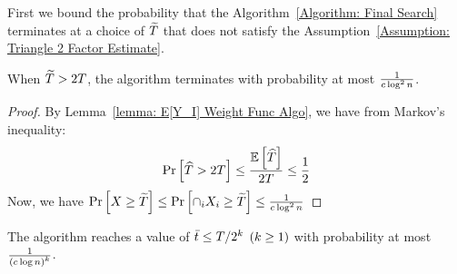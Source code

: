 First we bound the probability that the Algorithm~\ref{Algorithm: Final Search} terminates at a choice of $\widetilde{T}$ that does not satisfy the Assumption~\ref{Assumption: Triangle 2 Factor Estimate}.

\begin{lemma}\label{Lemma: Final Search Wrong Termination Bound}
    When $\widetilde{T} > 2T$, the algorithm terminates with probability at most $\frac{1}{c\log^2 n}$.
    
\end{lemma}

\begin{proof}
    By Lemma~\ref{lemma: E[Y_I] Weight Func Algo}, we have from Markov's inequality:
    \begin{align*}
        \Pr\left[{\widehat{T} > 2T}\right] \leq \frac{\operatorname*{\mathbb{E}}\left[{\widehat{T}}\right]}{2T} \leq \frac{1}{2}
    \end{align*}
    Now, we have $\Pr\left[{X \geq \widetilde{T}}\right] \leq \Pr\left[{\cap_{i}X_i \geq \widetilde{T}}\right] \leq \frac{1}{c\log^2 n}$
\end{proof}


    

\begin{lemma}\label{Lemma: Final Search Low Bar T Bound}
    The algorithm reaches a value of $\bar{t}  \leq T/2^k$ $\left({k \geq 1}\right)$ with probability at most $\frac{1}{\left({c\log n}\right)^k}$.
\end{lemma}

